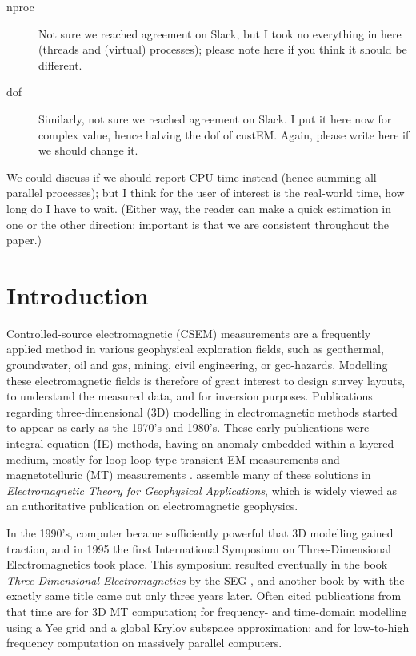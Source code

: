 \documentclass[
    paper,
  ]{geophysics}
\newcommand{\itodo}[1]{\todo[inline]{\sffamily #1}}
\begin{document}
\begin{itemize}
\begin{description}
        \item[nproc] Not sure we reached agreement on Slack, but I took no everything in here (threads and (virtual) processes); please note here if you think it should be different.
        \item[dof] Similarly, not sure we reached agreement on Slack. I put it here now for complex value, hence halving the dof of custEM. Again, please write here if we should change it.
    \end{description}
    We could discuss if we should report CPU time instead (hence summing all parallel processes); but I think for the user of interest is the real-world time, how long do I have to wait. (Either way, the reader can make a quick estimation in one or the other direction; important is that we are consistent throughout the paper.)
\end{itemize}
\itodo{\hfill$\Uparrow$\hfill$\Uparrow$\hfill List of things ToDo, Notes, etc\hfill$\Uparrow$\hfill$\Uparrow$\hfill~}
\newpage

\section{Introduction}

Controlled-source electromagnetic (CSEM) measurements are a frequently applied method in various geophysical exploration fields, such as geothermal, groundwater, oil and gas, mining, civil engineering, or geo-hazards. Modelling these electromagnetic fields is therefore of great interest to design survey layouts, to understand the measured data, and for inversion purposes. Publications regarding three-dimensional (3D) modelling in electromagnetic methods started to appear as early as the 1970's and 1980's. These early publications were integral equation (IE) methods, having an anomaly embedded within a layered medium, mostly for loop-loop type transient EM measurements \citep{GJI.74.Raiche, GEO.75.Hohmann, GJI.82.Das, GEO.86.Newman} and magnetotelluric (MT) measurements \citep{GEO.84.Wannamaker}. \cite{B.SEG.88.Ward} assemble many of these solutions in \emph{Electromagnetic Theory for Geophysical Applications}, which is widely viewed as an authoritative publication on electromagnetic geophysics.

In the 1990's, computer became sufficiently powerful that 3D modelling gained traction, and in 1995 the first International Symposium on Three-Dimensional Electromagnetics took place. This symposium resulted eventually in the book \emph{Three-Dimensional Electromagnetics} by the SEG \citep{B.SEG.99.Oristaglio}, and another book by \cite{B.02.Wannamaker} with the exactly same title came out only three years later. Often cited publications from that time are \cite{RSC.94.Mackie} for 3D MT computation; \cite{RS.94.Druskin} for frequency- and time-domain modelling using a Yee grid and a global Krylov subspace approximation; and \cite{RS.96.Alumbaugh, GJI.97.Newman} for low-to-high frequency computation on massively parallel computers.
\end{document}
